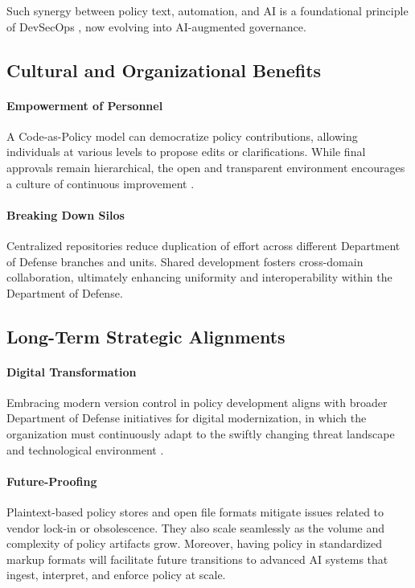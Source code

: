 \documentclass[11pt]{article}
\begin{document}
	Such synergy between policy text, automation, and AI is a foundational principle of DevSecOps \cite{Kim2016}, now evolving into AI-augmented governance.

	\subsection{Cultural and Organizational Benefits}

	\paragraph{Empowerment of Personnel}
	A Code-as-Policy model can democratize policy contributions, allowing individuals at various levels to propose edits or clarifications. While final approvals remain hierarchical, the open and transparent environment encourages a culture of continuous improvement \cite{Carucci2019}.

	\paragraph{Breaking Down Silos}
	Centralized repositories reduce duplication of effort across different Department of Defense branches and units. Shared development fosters cross-domain collaboration, ultimately enhancing uniformity and interoperability within the Department of Defense.

	\subsection{Long-Term Strategic Alignments}

	\paragraph{Digital Transformation}
	Embracing modern version control in policy development aligns with broader Department of Defense initiatives for digital modernization, in which the organization must continuously adapt to the swiftly changing threat landscape and technological environment \cite{DoDDigitalModernization2019}.

	\paragraph{Future-Proofing}
	Plaintext-based policy stores and open file formats mitigate issues related to vendor lock-in or obsolescence. They also scale seamlessly as the volume and complexity of policy artifacts grow. Moreover, having policy in standardized markup formats will facilitate future transitions to advanced AI systems that ingest, interpret, and enforce policy at scale.
\end{document}
